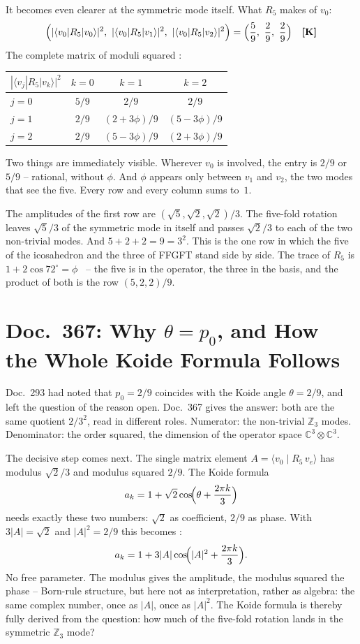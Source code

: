 It becomes even clearer at the symmetric mode itself. What $R_5$ makes of $v_0$:
\[
  \Bigl(|\langle v_0|R_5|v_0\rangle|^2,\ |\langle v_0|R_5|v_1\rangle|^2,\
  |\langle v_0|R_5|v_2\rangle|^2\Bigr) = \Bigl(\frac{5}{9},\ \frac{2}{9},\ \frac{2}{9}\Bigr) \quad \KM
\]
The complete matrix of moduli squared \KM:
\begin{center}
\begin{tabular}{@{}l|ccc@{}}
\toprule
$|\langle v_j|R_5|v_k\rangle|^2$ & $k=0$ & $k=1$ & $k=2$ \\
\midrule
$j=0$ & $5/9$ & $2/9$ & $2/9$ \\
$j=1$ & $2/9$ & $(2+3\phi)/9$ & $(5-3\phi)/9$ \\
$j=2$ & $2/9$ & $(5-3\phi)/9$ & $(2+3\phi)/9$ \\
\bottomrule
\end{tabular}
\end{center}
Two things are immediately visible. Wherever $v_0$ is involved, the entry is
$2/9$ or $5/9$ -- rational, without $\phi$. And $\phi$ appears only between
$v_1$ and $v_2$, the two modes that see the five. Every row and every column
sums to~$1$.

The amplitudes of the first row are $(\sqrt5,\sqrt2,\sqrt2)/3$. The five-fold rotation leaves
$\sqrt5/3$ of the symmetric mode in itself and passes $\sqrt2/3$ to each of the
two non-trivial modes. And $5+2+2 = 9 = 3^2$. This is the one row in which the
five of the icosahedron and the three of FFGFT stand side by side. The trace of
$R_5$ is $1 + 2\cos72^\circ = \phi$ \EM~-- the five is in the operator, the three
in the basis, and the product of both is the row $(5,2,2)/9$.

\section{Doc.~367: Why $\theta = p_0$, and How the Whole Koide Formula Follows}

Doc.~293 had noted that $p_0 = 2/9$ coincides with the Koide angle
$\theta = 2/9$, and left the question of the reason open. Doc.~367 gives the
answer: both are the same quotient $2/3^2$, read in different roles. Numerator:
the non-trivial $\mathbb{Z}_3$ modes. Denominator: the order squared, the
dimension of the operator space $\mathbb{C}^3\otimes\mathbb{C}^3$.

The decisive step comes next. The single matrix element
$A = \langle v_0\mid R_5\,v_e\rangle$ has modulus $\sqrt2/3$ and modulus squared
$2/9$. The Koide formula
\[
  a_k = 1 + \sqrt2\cos\!\Bigl(\theta + \frac{2\pi k}{3}\Bigr)
\]
needs exactly these two numbers: $\sqrt2$ as coefficient, $2/9$ as phase. With
$3|A| = \sqrt2$ and $|A|^2 = 2/9$ this becomes \BM:
\[
  a_k = 1 + 3|A|\cos\!\Bigl(|A|^2 + \frac{2\pi k}{3}\Bigr).
\]
No free parameter. The modulus gives the amplitude, the modulus squared the
phase -- Born-rule structure, but here not as interpretation, rather as algebra:
the same complex number, once as $|A|$, once as $|A|^2$. The Koide formula is
thereby fully derived from the question: how much of the five-fold rotation
lands in the symmetric $\mathbb{Z}_3$ mode?

